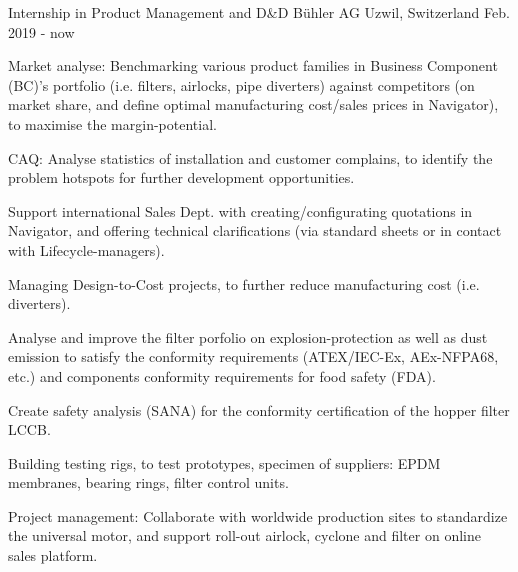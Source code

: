 

\begin{cventries}
	
\cventry
{Internship in Product Management and D\&D} %
{Bühler AG} %
{Uzwil, Switzerland} %
{Feb. 2019 - now} %
{
  \begin{cvitems} %
    \item {Market analyse: Benchmarking various product families in Business Component (BC)'s portfolio (i.e. filters, airlocks, pipe diverters) against competitors (on market share, and define optimal manufacturing cost/sales prices in Navigator), to maximise the margin-potential.}
    \item {CAQ: Analyse statistics of installation and customer complains, to identify the problem hotspots for further development opportunities.}
    \item {Support international Sales Dept. with creating/configurating quotations in Navigator, and offering technical clarifications (via standard sheets or in contact with Lifecycle-managers).}
    \item {Managing Design-to-Cost projects, to further reduce manufacturing cost (i.e. diverters).}
    \item {Analyse and improve the filter porfolio on explosion-protection as well as dust emission to satisfy the conformity requirements (ATEX/IEC-Ex, AEx-NFPA68, etc.) and components conformity requirements for food safety (FDA).}
    \item {Create safety analysis (SANA) for the conformity certification of the hopper filter LCCB.}
    \item {Building testing rigs, to test prototypes, specimen of suppliers: EPDM membranes, bearing rings, filter control units.}
    \item {Project management: Collaborate with worldwide production sites to standardize the universal motor, and support roll-out airlock, cyclone and filter on online sales platform.}
  \end{cvitems}
}


\end{cventries}

